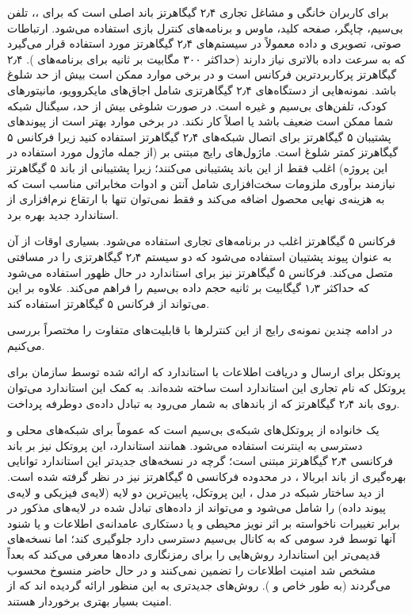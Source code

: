 برای کاربران خانگی و مشاغل تجاری ۲٫۴ گیگاهرتز باند اصلی است که برای ،، تلفن بی‌سیم، چاپگر، صفحه کلید، ماوس و برنامه‌های کنترل بازی استفاده می‌شود. ارتباطات صوتی، تصویری و داده معمولاً در سیستم‌های ۲٫۴ گیگاهرتز مورد استفاده قرار می‌گیرد که به سرعت داده بالاتری نیاز دارند (حداکثر ۳۰۰ مگابیت بر ثانیه برای برنامه‌های ). ۲٫۴ گیگاهرتز پرکاربردترین فرکانس است و در برخی موارد ممکن است بیش از حد شلوغ باشد. نمونه‌هایی از دستگاه‌های ۲٫۴ گیگاهرتزی شامل اجاق‌های مایکروویو، مانیتورهای کودک، تلفن‌های بی‌سیم و غیره است. در صورت شلوغی بیش از حد، سیگنال شبکه  شما ممکن است ضعیف باشد یا اصلاً کار نکند. در برخی موارد بهتر است از پیوندهای پشتیبان ۵ گیگاهرتز برای اتصال شبکه‌های  ۲٫۴ گیگاهرتز استفاده کنید زیرا فرکانس ۵ گیگاهرتز کمتر شلوغ است. ماژول‌های رایج مبتنی بر  (از جمله ماژول مورد استفاده در این پروژه) اغلب فقط از این باند پشتیبانی می‌کنند؛ زیرا پشتیبانی از باند ۵ گیگاهرتز نیازمند برآوری ملزومات سخت‌افزاری شامل آنتن و ادوات مخابراتی مناسب است که به هزینه‌ی نهایی محصول اضافه می‌کند و فقط نمی‌توان تنها با ارتقاع نرم‌افزاری از استاندارد جدید  بهره برد.
 
فرکانس ۵ گیگاهرتز اغلب در برنامه‌های تجاری  استفاده می‌شود. بسیاری اوقات از آن به عنوان پیوند پشتیبان استفاده می‌شود که دو سیستم ۲٫۴ گیگاهرتزی را در مسافتی متصل می‌کند. فرکانس ۵ گیگاهرتز نیز برای استاندارد در حال ظهور  استفاده می‌شود که حداکثر ۱٫۳ گیگابیت بر ثانیه حجم داده بی‌سیم را فراهم می‌کند. علاوه بر این  می‌تواند از فرکانس ۵ گیگاهرتز استفاده کند. 

در ادامه چندین نمونه‌ی رایج از این کنترلرها با قابلیت‌های متفاوت را مختصراً بررسی می‌کنیم.


پروتکل  برای ارسال و دریافت اطلاعات با استاندارد  که ارائه شده توسط سازمان  برای پروتکل  که نام تجاری این استاندارد است ساخته شده‌اند. به کمک این استاندارد می‌توان روی باند ۲٫۴ گیگاهرتز که از باندهای  به شمار می‌رود به تبادل داده‌ی دوطرفه پرداخت.

 یک خانواده از پروتکل‌های شبکه‌ی بی‌سیم است که عموماً برای شبکه‌های محلی و دسترسی به اینترنت استفاده می‌شود. همانند استاندارد، این پروتکل نیز بر باند فرکانسی ۲٫۴ گیگاهرتز مبتنی است؛ گرچه در نسخه‌های جدیدتر این استاندارد توانایی بهره‌گیری از باند ابربالا
،
در محدوده فرکانسی ۵ گیگاهرتز نیز در نظر گرفته شده است. از دید ساختار شبکه در مدل ،
این پروتکل، پایین‌ترین دو لایه (لایه‌ی فیزیکی و لایه‌ی پیوند داده) را شامل می‌شود و می‌تواند از داده‌های تبادل شده در لایه‌های مذکور در برابر تغییرات نا‌خواسته بر اثر نویز محیطی و یا دستکاری عامدانه‌ی اطلاعات و یا شنود آنها توسط فرد سومی که به کانال بی‌سیم دسترسی دارد جلوگیری کند؛ اما نسخه‌های قدیمی‌تر این استاندارد روش‌هایی را برای رمزنگاری داده‌ها معرفی می‌کند که بعداً مشخص شد امنیت اطلاعات را تضمین نمی‌کنند و در حال حاضر منسوخ محسوب می‌گردند (به طور خاص  و ). روش‌های جدیدتری به این منظور ارائه گردیده اند که از امنیت بسیار بهتری برخوردار هستند.

